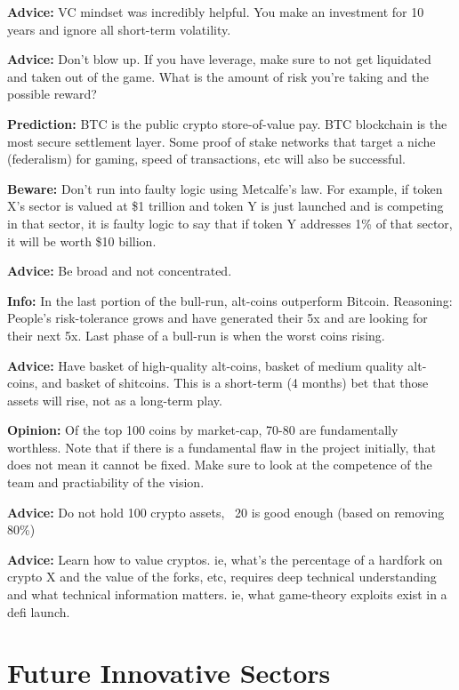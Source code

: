 \documentclass[10pt,twocolumn]{article}
\begin{document}
\textbf{Advice:} VC mindset was incredibly helpful. You make an investment for 10
years and ignore all short-term volatility. 

\textbf{Advice:} Don't blow up. If you have leverage, make sure to not get
liquidated and taken out of the game. What is the amount of risk you're taking
and the possible reward?

\textbf{Prediction:} BTC is the public crypto store-of-value pay. BTC blockchain is
the most secure settlement layer. Some proof of stake networks that target a
niche (federalism) for gaming, speed of transactions, etc will also be
successful. 

\textbf{Beware:} Don't run into faulty logic using Metcalfe's law. For example, if
token X's sector is valued at \$1 trillion and token Y is just launched and is
competing in that sector, it is faulty logic to say that if token Y addresses
1\% of that sector, it will be worth \$10 billion. 

\textbf{Advice:} Be broad and not concentrated. 

\textbf{Info:} In the last portion of the bull-run, alt-coins outperform Bitcoin.
Reasoning: People's risk-tolerance grows and have generated their 5x and are
looking for their next 5x. Last phase of a bull-run is when the worst coins
rising. 

\textbf{Advice:} Have basket of high-quality alt-coins, basket of medium quality
alt-coins, and basket of shitcoins. This is a short-term (4 months) bet that
those assets will rise, not as a long-term play. 

\textbf{Opinion:} Of the top 100 coins by market-cap, 70-80 are fundamentally
worthless. Note that if there is a fundamental flaw in the project initially,
that does not mean it cannot be fixed. Make sure to look at the competence of
the team and practiability of the vision. 

\textbf{Advice:} Do not hold 100 crypto assets, ~20 is good enough (based on
removing 80\%)

\textbf{Advice:} Learn how to value cryptos. ie, what's the percentage of a
hardfork on crypto X and the value of the forks, etc, requires deep technical
understanding and what technical information matters. ie, what game-theory
exploits exist in a defi launch. 

\section{Future Innovative Sectors} %
\end{document}
